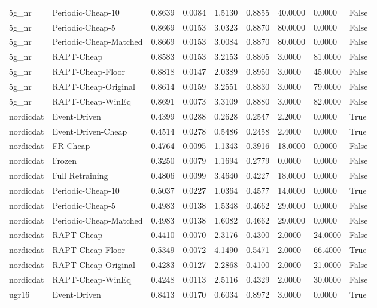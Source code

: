 \begin{table}[t]
\begin{tabular}{lllllllll}
5g\_nr & Periodic-Cheap-10 & 0.8639 & 0.0084 & 1.5130 & 0.8855 & 40.0000 & 0.0000 & False \\
5g\_nr & Periodic-Cheap-5 & 0.8669 & 0.0153 & 3.0323 & 0.8870 & 80.0000 & 0.0000 & False \\
5g\_nr & Periodic-Cheap-Matched & 0.8669 & 0.0153 & 3.0084 & 0.8870 & 80.0000 & 0.0000 & False \\
5g\_nr & RAPT-Cheap & 0.8583 & 0.0153 & 3.2153 & 0.8805 & 3.0000 & 81.0000 & False \\
5g\_nr & RAPT-Cheap-Floor & 0.8818 & 0.0147 & 2.0389 & 0.8950 & 3.0000 & 45.0000 & False \\
5g\_nr & RAPT-Cheap-Original & 0.8614 & 0.0159 & 3.2551 & 0.8830 & 3.0000 & 79.0000 & False \\
5g\_nr & RAPT-Cheap-WinEq & 0.8691 & 0.0073 & 3.3109 & 0.8880 & 3.0000 & 82.0000 & False \\
nordicdat & Event-Driven & 0.4399 & 0.0288 & 0.2628 & 0.2547 & 2.2000 & 0.0000 & True \\
nordicdat & Event-Driven-Cheap & 0.4514 & 0.0278 & 0.5486 & 0.2458 & 2.4000 & 0.0000 & True \\
nordicdat & FR-Cheap & 0.4764 & 0.0095 & 1.1343 & 0.3916 & 18.0000 & 0.0000 & False \\
nordicdat & Frozen & 0.3250 & 0.0079 & 1.1694 & 0.2779 & 0.0000 & 0.0000 & False \\
nordicdat & Full Retraining & 0.4806 & 0.0099 & 3.4640 & 0.4227 & 18.0000 & 0.0000 & False \\
nordicdat & Periodic-Cheap-10 & 0.5037 & 0.0227 & 1.0364 & 0.4577 & 14.0000 & 0.0000 & True \\
nordicdat & Periodic-Cheap-5 & 0.4983 & 0.0138 & 1.5348 & 0.4662 & 29.0000 & 0.0000 & False \\
nordicdat & Periodic-Cheap-Matched & 0.4983 & 0.0138 & 1.6082 & 0.4662 & 29.0000 & 0.0000 & False \\
nordicdat & RAPT-Cheap & 0.4410 & 0.0070 & 2.3176 & 0.4300 & 2.0000 & 24.0000 & False \\
nordicdat & RAPT-Cheap-Floor & 0.5349 & 0.0072 & 4.1490 & 0.5471 & 2.0000 & 66.4000 & True \\
nordicdat & RAPT-Cheap-Original & 0.4283 & 0.0127 & 2.2868 & 0.4100 & 2.0000 & 21.0000 & False \\
nordicdat & RAPT-Cheap-WinEq & 0.4248 & 0.0113 & 2.5116 & 0.4329 & 2.0000 & 30.0000 & False \\
ugr16 & Event-Driven & 0.8413 & 0.0170 & 0.6034 & 0.8972 & 3.0000 & 0.0000 & True \\

\end{tabular}
\end{table}
